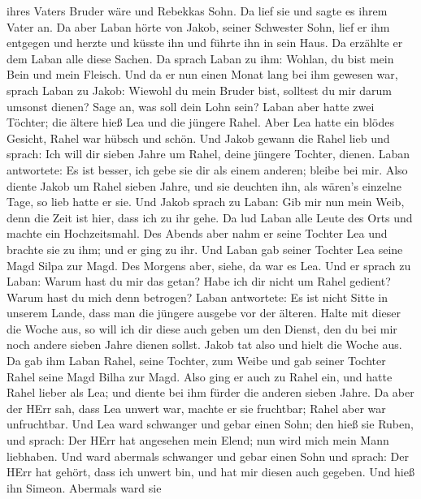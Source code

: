 ihres Vaters Bruder wäre und Rebekkas Sohn. Da lief sie und sagte es
ihrem Vater an.  Da aber Laban hörte von Jakob, seiner
Schwester Sohn, lief er ihm entgegen und herzte und küsste ihn und
führte ihn in sein Haus. Da erzählte er dem Laban alle diese Sachen.
 Da sprach Laban zu ihm: Wohlan, du bist mein Bein und mein
Fleisch. Und da er nun einen Monat lang bei ihm gewesen war,
 sprach Laban zu Jakob: Wiewohl du mein Bruder bist,
solltest du mir darum umsonst dienen? Sage an, was soll dein Lohn sein?
 Laban aber hatte zwei Töchter; die ältere hieß Lea und die
jüngere Rahel.  Aber Lea hatte ein blödes Gesicht, Rahel
war hübsch und schön.  Und Jakob gewann die Rahel lieb und
sprach: Ich will dir sieben Jahre um Rahel, deine jüngere Tochter,
dienen.  Laban antwortete: Es ist besser, ich gebe sie dir
als einem anderen; bleibe bei mir.  Also diente Jakob um
Rahel sieben Jahre, und sie deuchten ihn, als wären's einzelne Tage, so
lieb hatte er sie.  Und Jakob sprach zu Laban: Gib mir nun
mein Weib, denn die Zeit ist hier, dass ich zu ihr gehe. 
Da lud Laban alle Leute des Orts und machte ein Hochzeitsmahl.
 Des Abends aber nahm er seine Tochter Lea und brachte sie
zu ihm; und er ging zu ihr.  Und Laban gab seiner Tochter
Lea seine Magd Silpa zur Magd.  Des Morgens aber, siehe, da
war es Lea. Und er sprach zu Laban: Warum hast du mir das getan? Habe
ich dir nicht um Rahel gedient? Warum hast du mich denn betrogen?
 Laban antwortete: Es ist nicht Sitte in unserem Lande,
dass man die jüngere ausgebe vor der älteren.  Halte mit
dieser die Woche aus, so will ich dir diese auch geben um den Dienst,
den du bei mir noch andere sieben Jahre dienen sollst. 
Jakob tat also und hielt die Woche aus. Da gab ihm Laban Rahel, seine
Tochter, zum Weibe  und gab seiner Tochter Rahel seine Magd
Bilha zur Magd.  Also ging er auch zu Rahel ein, und hatte
Rahel lieber als Lea; und diente bei ihm fürder die anderen sieben
Jahre.  Da aber der HErr sah, dass Lea unwert war, machte
er sie fruchtbar; Rahel aber war unfruchtbar.  Und Lea ward
schwanger und gebar einen Sohn; den hieß sie Ruben, und sprach: Der HErr
hat angesehen mein Elend; nun wird mich mein Mann liebhaben.
 Und ward abermals schwanger und gebar einen Sohn und
sprach: Der HErr hat gehört, dass ich unwert bin, und hat mir diesen
auch gegeben. Und hieß ihn Simeon.  Abermals ward sie
